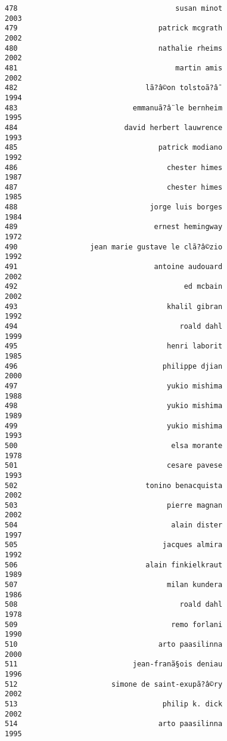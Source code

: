 \documentclass[
]{report}
\begin{document}
\begin{verbatim}
478                                     susan minot                2003
479                                 patrick mcgrath                2002
480                                 nathalie rheims                2002
481                                     martin amis                2002
482                              lã?â©on tolstoã?â¯                1994
483                           emmanuã?â¨le bernheim                1995
484                         david herbert lauwrence                1993
485                                 patrick modiano                1992
486                                   chester himes                1987
487                                   chester himes                1985
488                               jorge luis borges                1984
489                                ernest hemingway                1972
490                 jean marie gustave le clã?â©zio                1992
491                                antoine audouard                2002
492                                       ed mcbain                2002
493                                   khalil gibran                1992
494                                      roald dahl                1999
495                                   henri laborit                1985
496                                  philippe djian                2000
497                                   yukio mishima                1988
498                                   yukio mishima                1989
499                                   yukio mishima                1993
500                                    elsa morante                1978
501                                   cesare pavese                1993
502                              tonino benacquista                2002
503                                   pierre magnan                2002
504                                    alain dister                1997
505                                  jacques almira                1992
506                              alain finkielkraut                1989
507                                   milan kundera                1986
508                                      roald dahl                1978
509                                    remo forlani                1990
510                                 arto paasilinna                2000
511                           jean-franã§ois deniau                1996
512                      simone de saint-exupã?â©ry                2002
513                                  philip k. dick                2002
514                                 arto paasilinna                1995

\end{verbatim}
\end{document}
